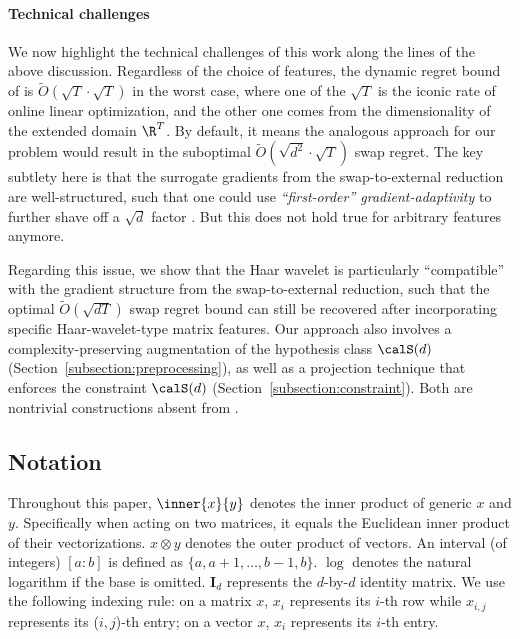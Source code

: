 \documentclass[10pt]{article}
\begin{document}
\paragraph{Technical challenges} We now highlight the technical challenges of this work along the lines of the above discussion. Regardless of the choice of features, the dynamic regret bound of \cite{zhang2023unconstrained} is $\tilde O(\sqrt{T}\cdot\sqrt{T})$ in the worst case, where one of the $\sqrt{T}$ is the iconic rate of online linear optimization, and the other one comes from the dimensionality of the extended domain $\R^T$. By default, it means the analogous approach for our problem would result in the suboptimal $\tilde O(\sqrt{d^2}\cdot\sqrt{T})$ swap regret. The key subtlety here is that the surrogate gradients from the swap-to-external reduction are well-structured, such that one could use \emph{``first-order'' gradient-adaptivity} to further shave off a $\sqrt{d}$ factor \citep{blum2007external}. But this does not hold true for arbitrary features anymore. 

Regarding this issue, we show that the Haar wavelet is particularly ``compatible'' with the gradient structure from the swap-to-external reduction, such that the optimal $\tilde O(\sqrt{dT})$ swap regret bound can still be recovered after incorporating specific Haar-wavelet-type matrix features. Our approach also involves a complexity-preserving augmentation of the hypothesis class $\calS(d)$ (Section~\ref{subsection:preprocessing}), as well as a projection technique that enforces the constraint $\calS(d)$ (Section~\ref{subsection:constraint}). Both are nontrivial constructions absent from \citep{zhang2023unconstrained}. 

\subsection{Notation}

Throughout this paper, $\inner{x}{y}$ denotes the inner product of generic $x$ and $y$. Specifically when acting on two matrices, it equals the Euclidean inner product of their vectorizations. $x\otimes y$ denotes the outer product of vectors. An interval (of integers) $[a:b]$ is defined as $\{a,a+1,\ldots,b-1,b\}$. $\log$ denotes the natural logarithm if the base is omitted. $\bm{I}_d$ represents the $d$-by-$d$ identity matrix. We use the following indexing rule: on a matrix $x$, $x_i$ represents its $i$-th row while $x_{i,j}$ represents its ($i,j$)-th entry; on a vector $x$, $x_i$ represents its $i$-th entry. 
\end{document}
